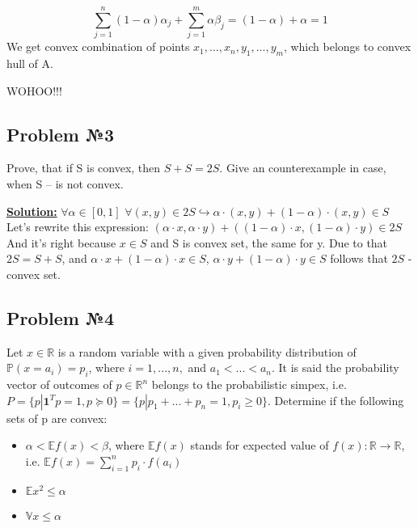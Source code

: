 \begin{equation*}
    \sum\limits_{j=1}^n(1-\alpha)\alpha_j + \sum\limits_{j=1}^m\alpha \beta_j = (1-\alpha) + \alpha = 1
\end{equation*}
We get convex combination of points $x_1, ..., x_n, y_1, ..., y_m$, which belongs to convex hull of A. 

WOHOO!!!




\subsection{Problem №3 }
Prove, that if S is convex, then $S + S = 2S$. Give an counterexample in case, when S -- is not convex.

\underline{\textbf{Solution:}}
\newline
$\forall \alpha \in [0, 1]$ $\forall (x, y) \in 2S \hookrightarrow \alpha \cdot (x, y) + (1 - \alpha) \cdot (x, y) \in S$
\newline
Let's rewrite this expression: $(\alpha \cdot x, \alpha \cdot y) + ( (1 - \alpha) \cdot x, (1 - \alpha) \cdot y) \in 2S$
And it's right because $x \in S$ and S is convex set, the same for y. Due to that $2S = S + S$, and $\alpha \cdot x + (1-\alpha)\cdot x \in S$, $\alpha \cdot y + (1-\alpha)\cdot y \in S$ follows that $2S$ - convex set.

\subsection{Problem №4}
Let $x \in \mathds{R}$ is a random variable with a given probability distribution of $\mathds{P}(x = a_i) = p_i$, where $i = 1, ..., n,$ and $a_1 < ... < a_n$. It is said the probability vector of outcomes of $p \in \mathds{R}^n$ belongs to the probabilistic simpex, i.e. $P = \{ p | \textbf{1}^Tp = 1, p \succcurlyeq 0\} = \{ p | p_1 + ... + p_n = 1, p_i \geq 0 \}$.
\newline
Determine if the following sets of p are convex:
\begin{itemize}
    \item $\alpha < \mathds{E} f(x) < \beta$, where $\mathds{E}f(x)$ stands for expected value of $f(x) : \mathds{R} \xrightarrow{} \mathds{R}$, i.e. $\mathds{E}f(x) = \sum\limits_{i=1}^n p_i\cdot f(a_i)$

    \item $\mathds{E}x^2 \leq \alpha$
    \item $\mathds{V}x \leq \alpha$
\end{itemize}

